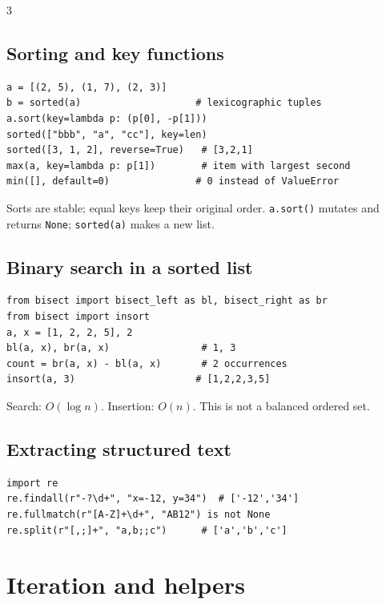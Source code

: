 \documentclass[9pt]{extarticle}
\let\referenceSubsection\subsection
\renewcommand{\subsection}{\needspace{4\baselineskip}\referenceSubsection}
\newcommand{\hint}[1]{{\small #1\par}}
\begin{document}
\begin{multicols*}{3}
\subsection{Sorting and key functions}
\begin{lstlisting}[label=py:sorting]
a = [(2, 5), (1, 7), (2, 3)]
b = sorted(a)                    # lexicographic tuples
a.sort(key=lambda p: (p[0], -p[1]))
sorted(["bbb", "a", "cc"], key=len)
sorted([3, 1, 2], reverse=True)   # [3,2,1]
max(a, key=lambda p: p[1])        # item with largest second
min([], default=0)               # 0 instead of ValueError
\end{lstlisting}
\hint{Sorts are stable; equal keys keep their original order.
\texttt{a.sort()} mutates and returns \texttt{None};
\texttt{sorted(a)} makes a new list.}

\subsection{Binary search in a sorted list}
\begin{lstlisting}[label=py:bisect]
from bisect import bisect_left as bl, bisect_right as br
from bisect import insort
a, x = [1, 2, 2, 5], 2
bl(a, x), br(a, x)                # 1, 3
count = br(a, x) - bl(a, x)       # 2 occurrences
insort(a, 3)                     # [1,2,2,3,5]
\end{lstlisting}
\hint{Search: $O(\log n)$. Insertion: $O(n)$.
This is not a balanced ordered set.}

\subsection{Extracting structured text}
\begin{lstlisting}[label=py:regex]
import re
re.findall(r"-?\d+", "x=-12, y=34")  # ['-12','34']
re.fullmatch(r"[A-Z]+\d+", "AB12") is not None
re.split(r"[,;]+", "a,b;;c")      # ['a','b','c']
\end{lstlisting}

\section{Iteration and helpers}


\end{multicols*}
\end{document}
